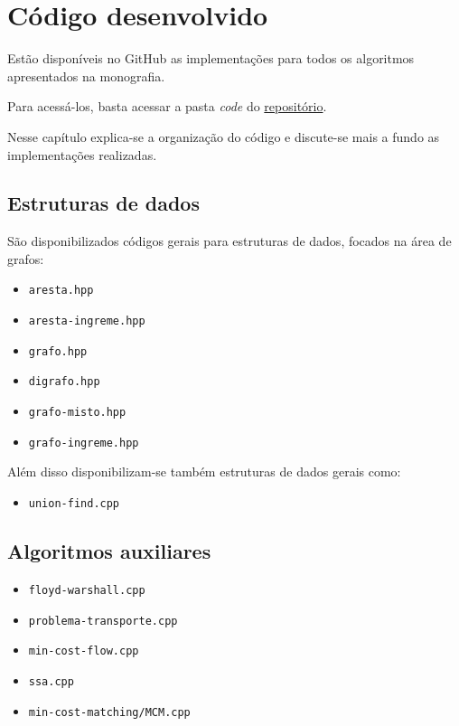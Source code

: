 \chapter{Código desenvolvido}

Estão disponíveis no GitHub as implementações para todos os algoritmos apresentados na monografia.

Para acessá-los, basta acessar a pasta \textit{code} do \href{github.com/gafeol/chinese-postman/}{repositório}.

Nesse capítulo explica-se a organização do código e discute-se mais a fundo as implementações realizadas.

\section{Estruturas de dados}

São disponibilizados códigos gerais para estruturas de dados, focados na área de grafos:
\begin{itemize}
    \item \texttt{aresta.hpp} 
    \item \texttt{aresta-ingreme.hpp}
    \item \texttt{grafo.hpp} 
    \item \texttt{digrafo.hpp}
    \item \texttt{grafo-misto.hpp}
    \item \texttt{grafo-ingreme.hpp}
\end{itemize}

Além disso disponibilizam-se também estruturas de dados gerais como:

\begin{itemize}
    \item \texttt{union-find.cpp}
\end{itemize}

\section{Algoritmos auxiliares}

\begin{itemize}
    \item \texttt{floyd-warshall.cpp}
    \item \texttt{problema-transporte.cpp}
    \item \texttt{min-cost-flow.cpp}
\end{itemize}

\begin{itemize}
    \item \texttt{ssa.cpp}
    \item \texttt{min-cost-matching/MCM.cpp}
\end{itemize}

